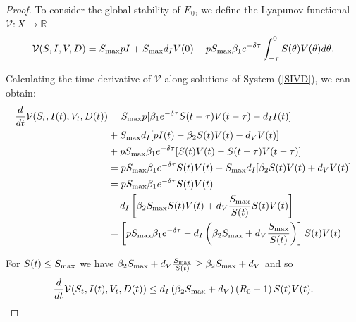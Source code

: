 \documentclass{CMHPhD-SIVD}
\begin{document}
\begin{proof} To consider the global stability of $E_0$, we define the Lyapunov functional  $\mathcal{V}: X\rightarrow\mathbb{R}$
\begin{equation}\label{34}
\mathcal{V}(S,I,V,D) = S_{\text{max}} p I+S_{\text{max}} d_I V(0)+p S_{\text{max}} \beta_1 e^{-\delta \tau}\int_{-\tau}^0S(\theta)V(\theta)d\theta.
\end{equation}

Calculating the time derivative of $\mathcal{V}$ along solutions of System (\ref{SIVD}), we can obtain:
\begin{align*}%
\frac{d}{dt}\mathcal{V}(S_t,I(t),V_t,D(t))&=\Smax p[\beta_1 e^{-\delta \tau}S(t-\tau)V(t-\tau)-d_I I(t)]\nonumber \\
&+\Smax d_I[pI(t)-\beta_2 S(t)V(t)-d_V V(t)]\nonumber \\
&+p \Smax \beta_1 e^{-\delta \tau}[S(t)V(t)-S(t-\tau)V(t-\tau)]\nonumber \\
&=p \Smax \beta_1 e^{-\delta \tau}S(t)V(t)-\Smax d_I[\beta_2 S(t)V(t)+d_V V(t)]\nonumber \\
&=p \Smax \beta_1 e^{-\delta \tau}S(t)V(t)\nonumber \\
&-d_I\left[\beta_2 \Smax S(t)V(t)+d_V \frac{\Smax}{S(t)} S(t)V(t)\right]
\nonumber \\
&= \left[p \Smax \beta_1 e^{-\delta \tau}-d_I\left(\beta_2 \Smax+d_V \frac{\Smax}{S(t)}\right)\right]S(t)V(t)\nonumber 
\end{align*}

For $S(t) \le S_{\text{max}}$ we have $\beta_2 S_{\text{max}}+d_V \frac{S_{\text{max}}}{S(t)} \ge \beta_2 S_{\text{max}}+d_V $ and so
	\begin{equation}\label{35}
		\frac{d}{dt}\mathcal{V}(S_t,I(t),V_t,D(t))\le d_I\left(\beta_2 S_{\text{max}}+d_V\right)\left(R_0-1\right)S(t)V(t).
	\end{equation}


\end{proof}
\end{document}
